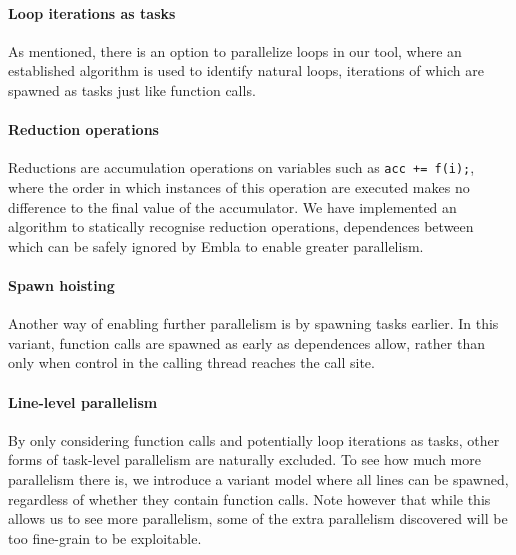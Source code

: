 \paragraph*{Loop iterations as tasks}
As mentioned, there is an option to parallelize loops in our tool,
where an established algorithm \cite{aho86compilers} is used to identify natural loops,
iterations of which are spawned as tasks just like function calls.

\paragraph*{Reduction operations}
Reductions are accumulation operations on variables such as \texttt{acc += f(i);},
where the order in which instances of this operation are executed makes no difference to the final value of the accumulator.
We have implemented an algorithm to statically recognise reduction operations,
dependences between which can be safely ignored by Embla to enable greater parallelism.

\paragraph*{Spawn hoisting}
Another way of enabling further parallelism is by spawning tasks earlier.
In this variant, function calls are spawned as early as dependences allow,
rather than only when control in the calling thread reaches the call site.

\paragraph*{Line-level parallelism}
By only considering function calls and potentially loop iterations as tasks, other forms of task-level parallelism are naturally excluded.
To see how much more parallelism there is, we introduce a variant model where all lines can be spawned, regardless of whether they contain function calls.
Note however that while this allows us to see more parallelism, some of the extra parallelism discovered will be too fine-grain to be exploitable.




































